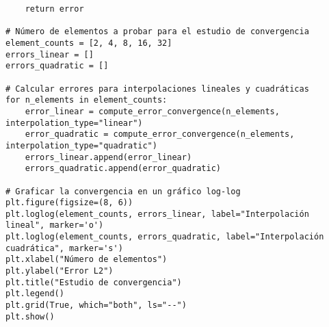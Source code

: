\begin{verbatim}
    return error

# Número de elementos a probar para el estudio de convergencia
element_counts = [2, 4, 8, 16, 32]
errors_linear = []
errors_quadratic = []

# Calcular errores para interpolaciones lineales y cuadráticas
for n_elements in element_counts:
    error_linear = compute_error_convergence(n_elements, interpolation_type="linear")
    error_quadratic = compute_error_convergence(n_elements, interpolation_type="quadratic")
    errors_linear.append(error_linear)
    errors_quadratic.append(error_quadratic)

# Graficar la convergencia en un gráfico log-log
plt.figure(figsize=(8, 6))
plt.loglog(element_counts, errors_linear, label="Interpolación lineal", marker='o')
plt.loglog(element_counts, errors_quadratic, label="Interpolación cuadrática", marker='s')
plt.xlabel("Número de elementos")
plt.ylabel("Error L2")
plt.title("Estudio de convergencia")
plt.legend()
plt.grid(True, which="both", ls="--")
plt.show()




\end{verbatim}